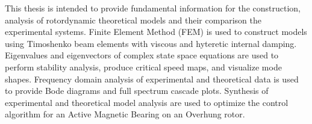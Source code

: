 This thesis is intended to provide fundamental information for the construction, analysis of rotordynamic theoretical models and their comparison the experimental systems. Finite Element Method (FEM) is used to construct models using Timoshenko beam elements with viscous and hyteretic internal damping. Eigenvalues and eigenvectors of complex state space equations are used to perform stability analysis, produce critical speed maps, and visualize mode shapes. Frequency domain analysis of experimental and theoretical data is used to provide Bode diagrams and full spectrum cascade plots. Synthesis of experimental and theoretical model analysis are used to optimize the control algorithm for an Active Magnetic Bearing on an Overhung rotor.
